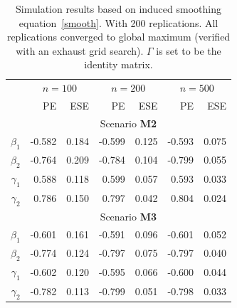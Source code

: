 \documentclass[a4paper,10pt]{article}
\begin{document}
\begin{table}[ht]
\centering
\caption{Simulation results based on induced smoothing equation~\eqref{smooth}. 
With 200 replications. 
All replications converged to global maximum (verified with an exhaust grid search).
$\Gamma$ is set to be the identity matrix.}
\begin{tabular}{r rrrrrr}
\toprule
& \multicolumn{2}{c}{$n=100$} & \multicolumn{2}{c}{$n=200$} & \multicolumn{2}{c}{$n=500$} \\
\cmidrule(l){2-3}\cmidrule(l){4-5}\cmidrule(l){6-7}
& PE & ESE& PE & ESE& PE & ESE\\
\midrule
& \multicolumn{6}{c}{Scenario \textbf{M2}}\\
$\beta_1$ &  -0.582 & 0.184 & -0.599 & 0.125 & -0.593 & 0.075 \\ 
$\beta_2$ &  -0.764 & 0.209 & -0.784 & 0.104 & -0.799 & 0.055 \\ 
$\gamma_1$ &  0.588 & 0.118 & 0.599 & 0.057 & 0.593 & 0.033 \\ 
$\gamma_2$ &  0.786 & 0.150 & 0.797 & 0.042 & 0.804 & 0.024 \\ 
& \multicolumn{6}{c}{Scenario \textbf{M3}}\\
$\beta_1$ &   -0.601 & 0.161 & -0.591 & 0.096 & -0.601 & 0.052 \\ 
$\beta_2$ &   -0.774 & 0.124 & -0.797 & 0.075 & -0.797 & 0.040 \\ 
$\gamma_1$ &   -0.602 & 0.120 & -0.595 & 0.066 & -0.600 & 0.044 \\ 
$\gamma_2$ &   -0.782 & 0.113 & -0.799 & 0.051 & -0.798 & 0.033 \\
\bottomrule
\end{tabular}
\end{table}
\end{document}

